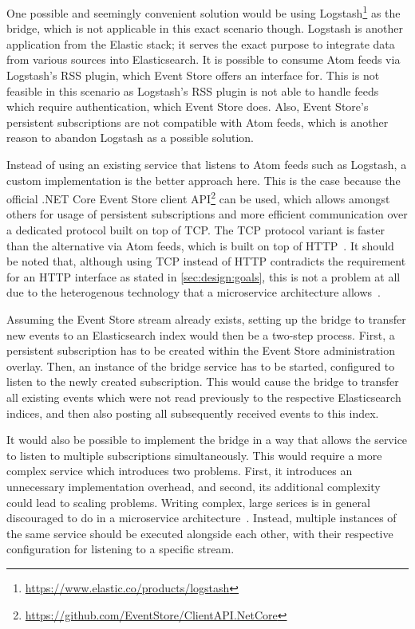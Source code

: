 One possible and seemingly convenient solution would be using Logstash\footnote{\url{https://www.elastic.co/products/logstash}} as the bridge, which is not applicable in this exact scenario though.
Logstash is another application from the Elastic stack; it serves the exact purpose to integrate data from various sources into Elasticsearch.
It is possible to consume Atom feeds via Logstash's \ac{RSS} plugin, which Event Store offers an interface for.
This is not feasible in this scenario as Logstash's \ac{RSS} plugin is not able to handle feeds which require authentication, which Event Store does.
Also, Event Store's persistent subscriptions are not compatible with Atom feeds, which is another reason to abandon Logstash as a possible solution.

Instead of using an existing service that listens to Atom feeds such as Logstash, a custom implementation is the better approach here.
This is the case because the official .NET Core Event Store client \ac{API}\footnote{\url{https://github.com/EventStore/ClientAPI.NetCore}} can be used, which allows amongst others for usage of persistent subscriptions and more efficient communication over a dedicated protocol built on top of \ac{TCP}.
The \ac{TCP} protocol variant is faster than the alternative via Atom feeds, which is built on top of \ac{HTTP}~\cite{WEB:EvtSt-Which-Api}.
It should be noted that, although using \ac{TCP} instead of \ac{HTTP} contradicts the requirement for an \ac{HTTP} interface as stated in \cref{sec:design:goals}, this is not a problem at all due to the heterogenous technology that a microservice architecture allows~\cite[Key Benefits,pp.~4f]{newman2015building}.

Assuming the Event Store stream already exists, setting up the bridge to transfer new events to an Elasticsearch index would then be a two-step process.
First, a persistent subscription has to be created within the Event Store administration overlay.
Then, an instance of the bridge service has to be started, configured to listen to the newly created subscription.
This would cause the bridge to transfer all existing events which were not read previously to the respective Elasticsearch indices, and then also posting all subsequently received events to this index.

It would also be possible to implement the bridge in a way that allows the service to listen to multiple subscriptions simultaneously.
This would require a more complex service which introduces two problems.
First, it introduces an unnecessary implementation overhead, and second, its additional complexity could lead to scaling problems.
Writing complex, large serices is in general discouraged to do in a microservice architecture~\cite[Key Benefits,pp.~5f]{newman2015building}.
Instead, multiple instances of the same service should be executed alongside each other, with their respective configuration for listening to a specific stream.

